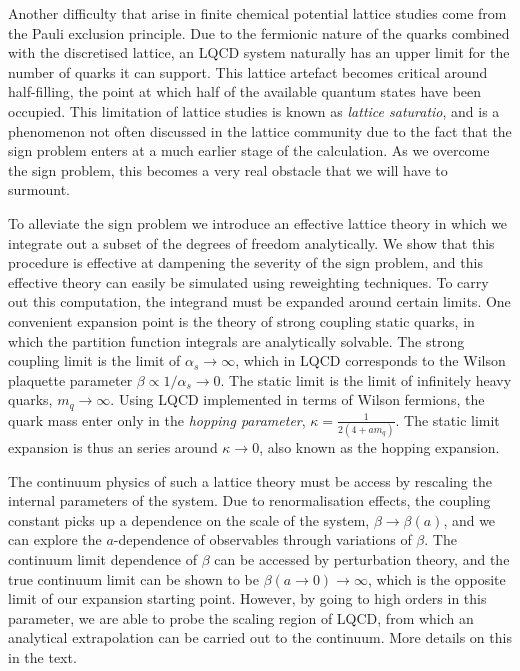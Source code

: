 {Another difficulty that arise in finite chemical potential lattice studies come
from the Pauli exclusion principle. Due to the fermionic nature of the quarks
combined with the discretised lattice, an LQCD system naturally has an upper
limit for the number of quarks it can support. This lattice artefact becomes
critical around half-filling, the point at which half of the available quantum
states have been occupied. This limitation of lattice studies is known as
\emph{lattice saturatio}, and is a phenomenon not often discussed in the lattice
community due to the fact that the sign problem enters at a much earlier stage
of the calculation. As we overcome the sign problem, this becomes a very real
obstacle that we will have to surmount.

To alleviate the sign problem we introduce an effective lattice theory in which
we integrate out a subset of the degrees of freedom analytically. We show that
this procedure is effective at dampening the severity of the sign problem, and
this effective theory can easily be simulated using reweighting techniques. To
carry out this computation, the integrand must be expanded around certain
limits. One convenient expansion point is the theory of strong coupling static
quarks, in which the partition function integrals are analytically solvable. The
strong coupling limit is the limit of $\alpha_s \to \infty$, which in LQCD
corresponds to the Wilson plaquette parameter $\beta \propto 1/\alpha_s \to 0$.
The static limit is the limit of infinitely heavy quarks, $m_q \to \infty$.
Using LQCD implemented in terms of Wilson fermions, the quark mass enter only in
the \emph{hopping parameter}, $\kappa = \frac{1}{2(4 + a m_q)}$. The static
limit expansion is thus an series around $\kappa \to 0$, also known as the
hopping expansion.

The continuum physics of such a lattice theory must be access by rescaling
the internal parameters of the system. Due to renormalisation effects, the
coupling constant picks up a dependence on the scale of the system, $\beta \to
\beta(a)$, and we can explore the $a$-dependence of observables through
variations of $\beta$. The continuum limit dependence of $\beta$ can be accessed
by perturbation theory, and the true continuum limit can be shown to be
$\beta(a \to 0) \to \infty$, which is the opposite limit of our expansion
starting point. However, by going to high orders in this parameter, we are able
to probe the scaling region of LQCD, from which an analytical extrapolation can
be carried out to the continuum. More details on this in the text.

}
